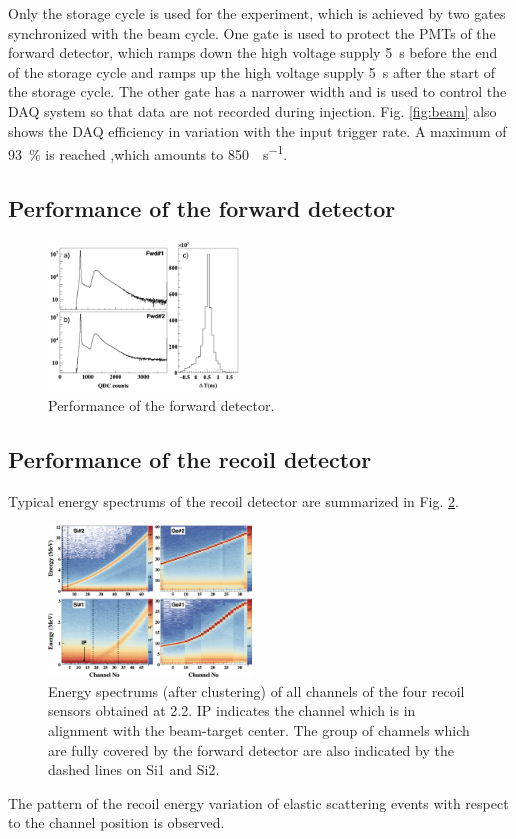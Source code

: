 \documentclass[number,5p]{elsarticle}
\begin{document}
Only the storage cycle is used for the experiment, which is achieved by two
gates synchronized with the beam cycle.
One gate is used to protect the PMTs of the forward detector, which ramps down the high voltage supply \SI{5}{\second} before the end of the
storage cycle and ramps up the high voltage supply \SI{5}{\second} after the start of the storage cycle.
The other gate has a narrower width and is used to control the DAQ system so that data are not recorded during injection.
Fig. \ref{fig:beam} also shows the DAQ efficiency in variation with the input trigger rate.
A maximum of \SI{93}{\percent} is reached ,which amounts to \SI{850}{\event\per\second}.

\subsection{Performance of the forward detector}
\label{fwd_performance}

\begin{figure}[htb!]
  \centering
  \includegraphics[width=0.45\textwidth]{./fwd_performance_white.png}
  \caption{Performance of the forward detector.
  }
  \label{fig:fwd_performance}
\end{figure}

\subsection{Performance of the recoil detector}
\label{recoil_performance}
Typical energy spectrums of the recoil detector are summarized in Fig. \ref{fig:e_map}.
\begin{figure}[htb!]
  \centering
  \includegraphics[width=0.48\textwidth]{./e_map.png}
  \caption{Energy spectrums (after clustering) of all channels of the four recoil
    sensors obtained at \SI{2.2}{\momentum}.
    IP indicates the channel which is in alignment with
    the beam-target center.
    The group of channels which are fully covered by the forward detector are
    also indicated by the dashed lines on Si1 and Si2.
  }
  \label{fig:e_map}
\end{figure}
The pattern of the recoil energy variation of elastic scattering events with respect to the channel position is observed.
\end{document}
